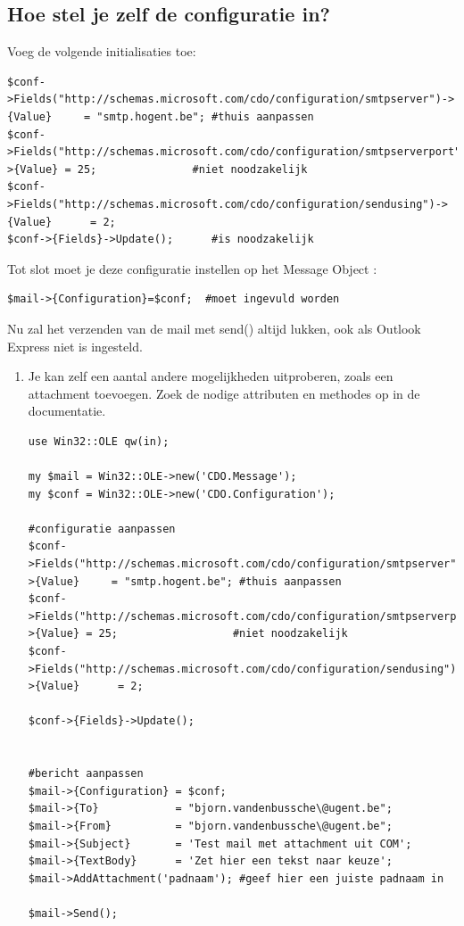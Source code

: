 \documentclass[11pt,a4paper]{report}
\begin{document}
\subsection{Hoe stel je zelf de configuratie in?}
Voeg de volgende initialisaties toe:
\begin{lstlisting}
$conf->Fields("http://schemas.microsoft.com/cdo/configuration/smtpserver")->{Value}     = "smtp.hogent.be"; #thuis aanpassen
$conf->Fields("http://schemas.microsoft.com/cdo/configuration/smtpserverport")->{Value} = 25;               #niet noodzakelijk
$conf->Fields("http://schemas.microsoft.com/cdo/configuration/sendusing")->{Value}      = 2;
$conf->{Fields}->Update();      #is noodzakelijk
\end{lstlisting}
Tot slot moet je deze configuratie instellen op het Message Object :
\begin{lstlisting}
$mail->{Configuration}=$conf;  #moet ingevuld worden
\end{lstlisting}
Nu zal het verzenden van de mail met send() altijd lukken, ook als Outlook Express niet is ingesteld.
\begin{enumerate}[resume]
	\item Je kan zelf een aantal andere mogelijkheden uitproberen, zoals een attachment toevoegen. Zoek de nodige attributen en methodes op in de documentatie.
\begin{lstlisting}
use Win32::OLE qw(in);

my $mail = Win32::OLE->new('CDO.Message');
my $conf = Win32::OLE->new('CDO.Configuration');

#configuratie aanpassen
$conf->Fields("http://schemas.microsoft.com/cdo/configuration/smtpserver")->{Value}     = "smtp.hogent.be"; #thuis aanpassen
$conf->Fields("http://schemas.microsoft.com/cdo/configuration/smtpserverport")->{Value} = 25;                  #niet noodzakelijk
$conf->Fields("http://schemas.microsoft.com/cdo/configuration/sendusing")->{Value}      = 2;

$conf->{Fields}->Update();


#bericht aanpassen
$mail->{Configuration} = $conf;
$mail->{To}            = "bjorn.vandenbussche\@ugent.be";
$mail->{From}          = "bjorn.vandenbussche\@ugent.be";
$mail->{Subject}       = 'Test mail met attachment uit COM';
$mail->{TextBody}      = 'Zet hier een tekst naar keuze';
$mail->AddAttachment('padnaam'); #geef hier een juiste padnaam in

$mail->Send();
\end{lstlisting}
\end{enumerate}
\end{document}
